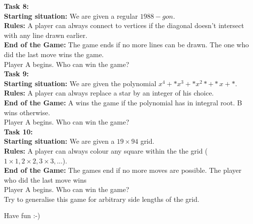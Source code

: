 \documentclass[11pt,a5paper]{article}
\begin{document}
\noindent
\textbf{Task 8:}\\
\noindent
\textbf{Starting situation:} We are given a regular $1988-gon$.\\
\textbf{Rules:} A player can always connect to vertices if the diagonal doesn't intersect with any line drawn earlier.\\
\textbf{End of the Game:} The game ends if no more lines can be drawn. The one who did the last move wins the game.\\
\noindent
Player A begins. Who can win the game?\\

\noindent
\textbf{Task 9:}\\
\noindent
\textbf{Starting situation:} We are given the polynomial $x^4+*x^3+*x^2*+*x+*$.\\
\textbf{Rules:} A player can always replace a star by an integer of his choice.\\
\textbf{End of the Game:} A wins the game if the polynomial has in integral root. B wins otherwise.\\
\noindent
Player A begins. Who can win the game?\\

\noindent
\textbf{Task 10:}\\
\noindent
\textbf{Starting situation:} We are given a $19 \times 94$ grid.\\
\textbf{Rules:} A player can always colour any square within the the grid ($1\times1, 2\times2, 3\times3,...$).\\
\textbf{End of the Game:} The games end if no more moves are possible. The player who did the last move wins\\
\noindent
Player A begins. Who can win the game?\\
Try to generalise this game for arbitrary side lengths of the grid. \\[1cm]

\begin{center}
Have fun :-)
\end{center}
\end{document}
